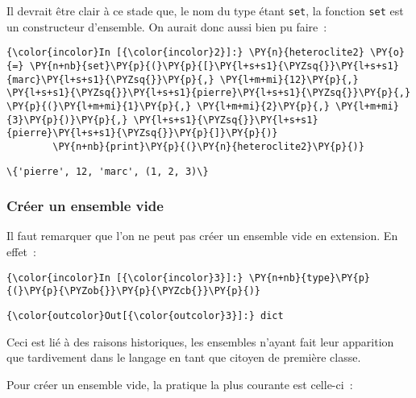     Il devrait être clair à ce stade que, le nom du type étant \texttt{set},
la fonction \texttt{set} est un constructeur d'ensemble. On aurait donc
aussi bien pu faire~:

    \begin{Verbatim}[commandchars=\\\{\}]
{\color{incolor}In [{\color{incolor}2}]:} \PY{n}{heteroclite2} \PY{o}{=} \PY{n+nb}{set}\PY{p}{(}\PY{p}{[}\PY{l+s+s1}{\PYZsq{}}\PY{l+s+s1}{marc}\PY{l+s+s1}{\PYZsq{}}\PY{p}{,} \PY{l+m+mi}{12}\PY{p}{,} \PY{l+s+s1}{\PYZsq{}}\PY{l+s+s1}{pierre}\PY{l+s+s1}{\PYZsq{}}\PY{p}{,} \PY{p}{(}\PY{l+m+mi}{1}\PY{p}{,} \PY{l+m+mi}{2}\PY{p}{,} \PY{l+m+mi}{3}\PY{p}{)}\PY{p}{,} \PY{l+s+s1}{\PYZsq{}}\PY{l+s+s1}{pierre}\PY{l+s+s1}{\PYZsq{}}\PY{p}{]}\PY{p}{)}
        \PY{n+nb}{print}\PY{p}{(}\PY{n}{heteroclite2}\PY{p}{)}
\end{Verbatim}


    \begin{Verbatim}[commandchars=\\\{\}]
\{'pierre', 12, 'marc', (1, 2, 3)\}

    \end{Verbatim}

    \hypertarget{cruxe9er-un-ensemble-vide}{%
\subsubsection{Créer un ensemble vide}\label{cruxe9er-un-ensemble-vide}}

    Il faut remarquer que l'on ne peut pas créer un ensemble vide en
extension. En effet~:

    \begin{Verbatim}[commandchars=\\\{\}]
{\color{incolor}In [{\color{incolor}3}]:} \PY{n+nb}{type}\PY{p}{(}\PY{p}{\PYZob{}}\PY{p}{\PYZcb{}}\PY{p}{)}
\end{Verbatim}


\begin{Verbatim}[commandchars=\\\{\}]
{\color{outcolor}Out[{\color{outcolor}3}]:} dict
\end{Verbatim}
            
    Ceci est lié à des raisons historiques, les ensembles n'ayant fait leur
apparition que tardivement dans le langage en tant que citoyen de
première classe.

    Pour créer un ensemble vide, la pratique la plus courante est celle-ci~:

